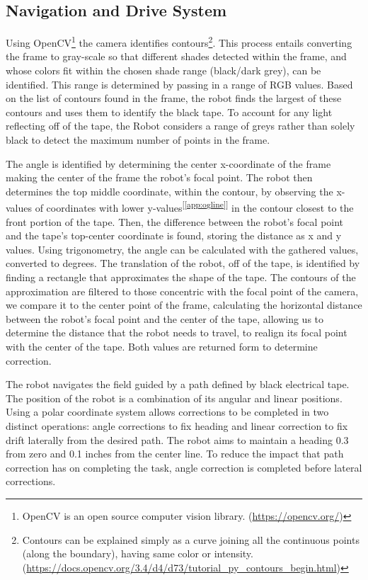 \documentclass[11pt, hidelinks]{report}
\newcommand{\refapp}[1]{\textsuperscript{[\ref{#1}]}}
\begin{document}
\subsection{Navigation and Drive System}
Using OpenCV\footnote{OpenCV is an open source computer vision library. (\url{https://opencv.org/})} the camera identifies contours\footnote{Contours can be explained simply as a curve joining all the continuous points (along the boundary), having same color or intensity. (\url{https://docs.opencv.org/3.4/d4/d73/tutorial_py_contours_begin.html})}. This process entails converting the frame to gray-scale so that different shades detected within the frame, and whose colors fit within the chosen shade range (black/dark grey), can be identified. This range is determined by passing in a range of RGB values. Based on the list of contours found in the frame, the robot finds the largest of these contours and uses them to identify the black tape. To account for any light reflecting off of the tape, the Robot considers a range of greys rather than solely black to detect the maximum number of points in the frame.

The angle is identified by determining the center x-coordinate of the frame making the center of the frame the robot’s focal point. The robot then determines the top middle coordinate, within the contour, by observing the x-values of coordinates with lower y-values\refapp{app:ogline} in the contour closest to the front portion of the tape. Then, the difference between the robot’s focal point and the tape’s top-center coordinate is found, storing the distance as x and y values. Using trigonometry, the angle can be calculated with the gathered values, converted to degrees. 
The translation of the robot, off of the tape, is identified by finding a rectangle that approximates the shape of the tape. The contours of the approximation are filtered to those concentric with the focal point of the camera, we compare it to the center point of the frame, calculating the horizontal distance between the robot’s focal point and the center of the tape, allowing us to determine the distance that the robot needs to travel, to realign its focal point with the center of the tape. Both values are returned form  to determine correction.

The robot navigates the field guided by a path defined by black electrical tape. The position of the robot is a combination of its angular and linear positions. Using a polar coordinate system allows corrections to be completed in two distinct operations: angle corrections to fix heading and linear correction to fix drift laterally from the desired path. The robot aims to maintain a heading \sfrac{+}{-} {0.3\textdegree} from zero and \sfrac{+}{-} 0.1 inches from the center line. To reduce the impact that path correction has on completing the task, angle correction is completed before lateral corrections.
\end{document}
